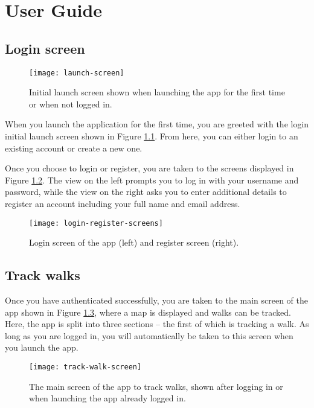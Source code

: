 \chapter{User Guide}

\section{Login screen}

\begin{figure}[H]
  \centering
  \texttt{[image: launch-screen]}
  \caption{Initial launch screen shown when launching the app for the first time or when not logged in.}
  \label{fig:launch-screen}
\end{figure}

When you launch the application for the first time, you are greeted with the login initial launch screen shown in Figure \ref{fig:launch-screen}. From here, you can either login to an existing account or create a new one.

Once you choose to login or register, you are taken to the screens displayed in Figure \ref{fig:login-register-screens}. The view on the left prompts you to log in with your username and password, while the view on the right asks you to enter additional details to register an account including your full name and email address.     

\begin{figure}[hbt]
  \centering
  \texttt{[image: login-register-screens]}
  \caption{Login screen of the app (left) and register screen (right).}
  \label{fig:login-register-screens}
\end{figure}


\section{Track walks}

Once you have authenticated successfully, you are taken to the main screen of the app shown in Figure \ref{fig:track-walk-screen}, where a map is displayed and walks can be tracked. Here, the app is split into three sections -- the first of which is tracking a walk. As long as you are logged in, you will automatically be taken to this screen when you launch the app.

\begin{figure}[hbt]
  \centering
  \texttt{[image: track-walk-screen]}
  \caption{The main screen of the app to track walks, shown after logging in or when launching the app already logged in.}
  \label{fig:track-walk-screen}
\end{figure}


